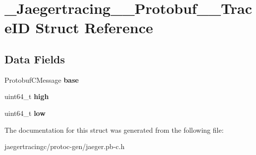 \hypertarget{struct__Jaegertracing____Protobuf____TraceID}{}\section{\+\_\+\+Jaegertracing\+\_\+\+\_\+\+Protobuf\+\_\+\+\_\+\+Trace\+ID Struct Reference}
\label{struct__Jaegertracing____Protobuf____TraceID}
\subsection*{Data Fields}
\begin{DoxyCompactItemize}
\item 
\mbox{\label{struct__Jaegertracing____Protobuf____TraceID_a3713d5f4c04c8d2bf77538570b64e309}} 
Protobuf\+C\+Message {\bfseries base}
\item 
\mbox{\label{struct__Jaegertracing____Protobuf____TraceID_acb8616809166eb442ea72b501bcccab8}} 
uint64\+\_\+t {\bfseries high}
\item 
\mbox{\label{struct__Jaegertracing____Protobuf____TraceID_a5aa68d7ad357f5740edb85f908266f4b}} 
uint64\+\_\+t {\bfseries low}
\end{DoxyCompactItemize}


The documentation for this struct was generated from the following file\+:\begin{DoxyCompactItemize}
\item 
jaegertracingc/protoc-\/gen/jaeger.\+pb-\/c.\+h\end{DoxyCompactItemize}
